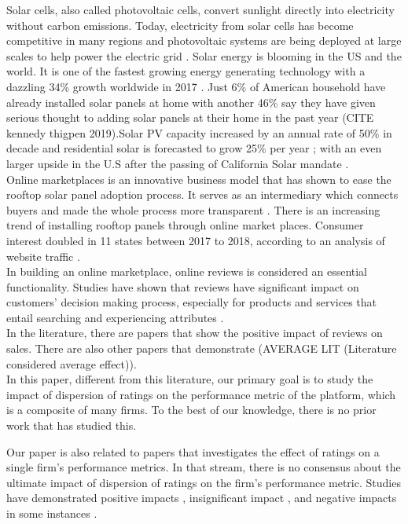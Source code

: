 \documentclass[msom,blindrev]{informs3}
\begin{document}
Solar cells, also called photovoltaic cells, convert sunlight directly into electricity without carbon emissions. Today, electricity from solar cells has become competitive in many regions and photovoltaic systems are being deployed at large scales to help power the electric grid \citep{nrel.gov}.
Solar energy is blooming in the US and the world. It is one of the fastest growing energy generating technology with a dazzling 34\% growth worldwide in 2017 \citep{iea2018snapshot}. Just 6\% of American household have already installed solar panels at home with another 46\% say they have given serious thought to adding solar panels at their home in the past year (CITE kennedy thigpen 2019).Solar PV capacity increased by an annual rate of 50\%  in decade and residential solar is forecasted to grow 25\% per year \citep{weaver_2019,seia}; with an even larger upside in the U.S after the passing of California Solar mandate \citep{gtmsolar2018}. \\
Online marketplaces is an innovative business model that has shown to ease the rooftop solar panel adoption process. It serves as an intermediary which connects buyers and made the whole process more transparent \citep{dorsey2019access}. There is an increasing trend of installing rooftop panels through online market places. Consumer interest doubled in 11 states between 2017 to 2018, according to an analysis of website traffic \citep{energysageintel19}.  \\
In building an online marketplace, online reviews is considered an essential functionality. Studies have shown that reviews have significant impact on customers'  decision making process, especially for products and services that entail searching and experiencing attributes \citep{zimmermann2018decomposing}.  \\
In the literature, there are papers that show the positive impact of reviews on sales. There are also other papers that demonstrate  (AVERAGE LIT (Literature considered average effect)).\\
In this paper, different from this literature, our primary goal is to study the impact of dispersion of ratings on the  performance metric of the platform, which is a composite of many firms. To the best of our knowledge, there is no prior work that has studied this.

Our paper is also related to papers that investigates the effect of ratings on a single firm's performance metrics. In that stream, there is no consensus about the ultimate impact of dispersion of ratings on the firm's performance metric. Studies have demonstrated positive impacts \citep{chintagunta2010effects,chevalier2006effect,dellarocas2007exploring}, insignificant impact \citep{duan2008online}, and negative impacts in some instances \citep{wang2015user}.
\end{document}
